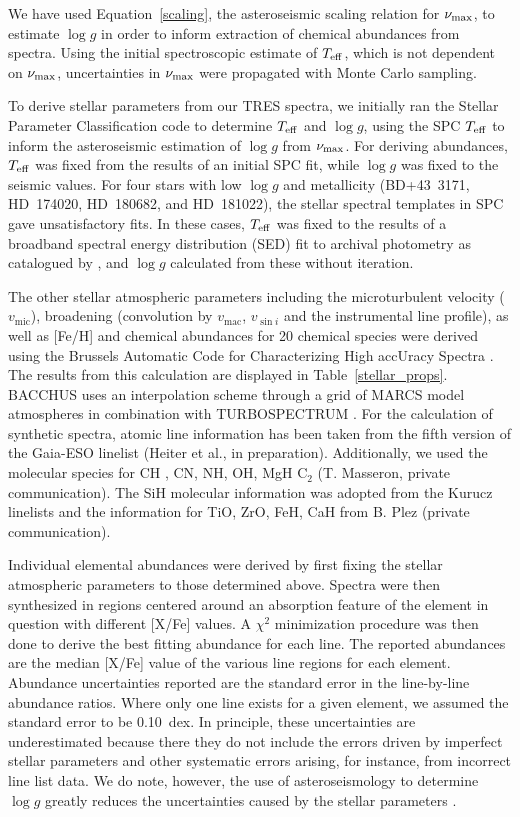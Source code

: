 \documentclass[a4paper,fleqn,usenatbib]{mnras}
\newcommand{\numax}{\mbox{$\nu_{\rm max}$}\xspace}
\newcommand{\teff}{\mbox{$T_{\rm eff}$}\xspace}
\newcommand{\logg}{\mbox{$\log g$}\xspace}
\begin{document}
We have used Equation~\ref{scaling}, the asteroseismic scaling relation for \numax \citep{1991ApJ...368..599B,KB95}, to estimate \logg in order to inform extraction of chemical abundances from spectra. Using the initial spectroscopic estimate of \teff, which is not dependent on \numax, uncertainties in \numax were propagated with Monte Carlo sampling. 

To derive stellar parameters from our TRES spectra, we initially ran the Stellar Parameter Classification code \citep[SPC:][]{spc} to determine \teff and \logg, using the SPC \teff to inform the asteroseismic estimation of \logg from \numax. For deriving abundances, \teff was fixed from the results of an initial SPC fit, while \logg was fixed to the seismic values. For four stars with low \logg and metallicity (BD+43~3171, HD~174020, HD~180682, and HD~181022), the stellar spectral templates in SPC gave unsatisfactory fits. In these cases, \teff was fixed to the results of a broadband spectral energy distribution (SED) fit to archival photometry as catalogued by \citet{Mcdonald2017}, and \logg calculated from these without iteration.

The other stellar atmospheric parameters including the microturbulent velocity ($v_{\text{mic}}$), broadening (convolution by $v_{\text{mac}}$, $v_{\sin{i}}$ and the instrumental line profile), as well as [Fe/H] and chemical abundances for 20 chemical species were derived using the Brussels Automatic Code for Characterizing High accUracy Spectra \citep[BACCHUS:][]{bacchus}. The results from this calculation are displayed in Table~\ref{stellar_props}. BACCHUS uses an interpolation scheme through a grid of MARCS model atmospheres \citep{Gustafsson2008} in combination with TURBOSPECTRUM \citep{Alvarez1998, Plez2012}. For the calculation of synthetic spectra, atomic line information has been taken from the fifth version of the Gaia-ESO linelist (Heiter et al., in preparation). Additionally, we used the molecular species for CH \citep{Masseron2014}, CN, NH, OH, MgH  C$_{2}$ (T. Masseron, private communication). The SiH molecular information was adopted from the Kurucz linelists and the information for TiO, ZrO, FeH, CaH from B. Plez (private communication). 

Individual elemental abundances were derived by first fixing the stellar atmospheric parameters to those determined above. Spectra were then synthesized in regions centered around an absorption feature of the element in question with different [X/Fe] values. A $\chi^2$ minimization procedure was then done to derive the best fitting abundance for each line. The reported abundances are the median [X/Fe] value of the various line regions for each element. Abundance uncertainties reported are the standard error in the line-by-line abundance ratios. Where only one line exists for a given element, we assumed the standard error to be 0.10~dex. In principle, these uncertainties are underestimated because there they do not include the errors driven by imperfect stellar parameters and other systematic errors arising, for instance, from incorrect line list data. We do note, however, the use of asteroseismology to determine \logg greatly reduces the uncertainties caused by the stellar parameters \citep[see][for a longer discussion on this]{hawkinsapogee}. 
\end{document}
